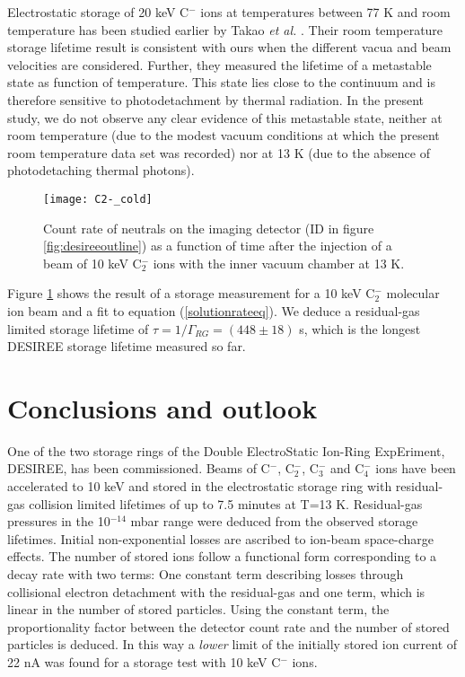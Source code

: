 \documentclass[aps,pra,preprint,superscriptaddress]{revtex4}
\begin{document}
Electrostatic storage of 20 keV C$^-$ ions at temperatures between 77 K and room temperature has been studied earlier by Takao {\it et al.} \cite{Tak07}. Their room temperature storage lifetime result is consistent with ours when the different vacua and beam velocities are considered. Further, they measured the lifetime of a metastable state as function of temperature. This state lies close to the continuum and is therefore sensitive to photodetachment by thermal radiation. In the present study, we do not observe any clear evidence of this metastable state, neither at room temperature (due to the modest vacuum conditions at which the present room temperature data set was recorded) nor at 13 K (due to the absence of photodetaching thermal photons).

\begin{figure}
	\centering
		\texttt{[image: C2-\_cold]}
	\caption{Count rate of neutrals on the imaging detector (ID in figure \ref{fig:desireeoutline}) as a function of time after the injection of a beam of 10 keV C$_2^-$ ions with the inner vacuum chamber at 13 K.}
	\label{fig:C2-_cold}
\end{figure}

Figure \ref{fig:C2-_cold} shows the result of a storage measurement for a 10 keV C$_2^-$ molecular ion beam and a fit to equation (\ref{solutionrateeq}). We deduce a residual-gas limited storage lifetime of $\tau=1/\Gamma_{RG}=(448 \pm 18)$ s, which is the longest DESIREE storage lifetime measured so far.

\section{Conclusions and outlook}
One of the two storage rings of the Double ElectroStatic Ion-Ring ExpEriment, DESIREE, has been commissioned. Beams of C$^-$, C$_2^-$, C$_3^-$ and C$_4^-$ ions have been accelerated to 10 keV and stored in the electrostatic storage ring with residual-gas collision limited lifetimes of up to 7.5 minutes at T=13 K.
Residual-gas pressures in the 10$^{-14}$ mbar range were deduced from the observed storage lifetimes. Initial non-exponential losses are ascribed to ion-beam space-charge effects. The number of stored ions follow a functional form corresponding to a decay rate with two terms: One constant term describing losses through collisional electron detachment with the residual-gas and one term, which is linear in the number of stored particles. Using the constant term, the proportionality factor between the detector count rate and the number of stored particles is deduced. In this way a {\it lower} limit of the initially stored ion current of 22 nA was found for a storage test with 10 keV C$^-$ ions.
\end{document}
